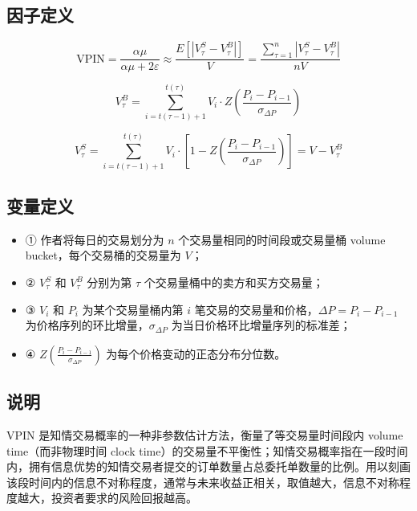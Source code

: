 \documentclass{article}
\begin{document}
\subsection{因子定义}

\begin{equation}
    \mathrm{VPIN} = \frac{\alpha\mu}{\alpha\mu + 2\varepsilon} \approx \frac{E[|V_\tau^S - V_\tau^B|]}{V} = \frac{\sum_{\tau=1}^n |V_\tau^S - V_\tau^B|}{nV}
\end{equation}

\begin{equation}
    V_\tau^B = \sum_{i=t(\tau-1)+1}^{t(\tau)} V_i \cdot Z \left( \frac{P_i - P_{i-1}}{\sigma_{\Delta P}} \right)
\end{equation}

\begin{equation}
    V_\tau^S = \sum_{i=t(\tau-1)+1}^{t(\tau)} V_i \cdot \left[ 1 - Z \left( \frac{P_i - P_{i-1}}{\sigma_{\Delta P}} \right) \right] = V - V_\tau^B
\end{equation}

\subsection{变量定义}
\begin{itemize}
    \item ① 作者将每日的交易划分为 \( n \) 个交易量相同的时间段或交易量桶 volume bucket，每个交易桶的交易量为 \( V \)；
    \item ② \( V_\tau^S \) 和 \( V_\tau^B \) 分别为第 \( \tau \) 个交易量桶中的卖方和买方交易量；
    \item ③ \( V_i \) 和 \( P_i \) 为某个交易量桶内第 \( i \) 笔交易的交易量和价格，\( \Delta P = P_i - P_{i-1} \) 为价格序列的环比增量，\( \sigma_{\Delta P} \) 为当日价格环比增量序列的标准差；
    \item ④ \( Z \left( \frac{P_i - P_{i-1}}{\sigma_{\Delta P}} \right) \) 为每个价格变动的正态分布分位数。
\end{itemize}

\subsection{说明}
VPIN 是知情交易概率的一种非参数估计方法，衡量了等交易量时间段内 volume time（而非物理时间 clock time）的交易量不平衡性；知情交易概率指在一段时间内，拥有信息优势的知情交易者提交的订单数量占总委托单数量的比例。用以刻画该段时间内的信息不对称程度，通常与未来收益正相关，取值越大，信息不对称程度越大，投资者要求的风险回报越高。
\end{document}
